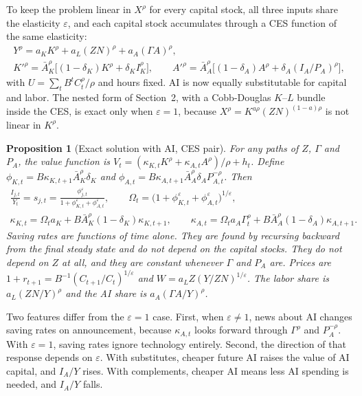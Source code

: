 \documentclass[11pt]{article}
\newtheorem{proposition}{Proposition}
\newcommand{\e}{\varepsilon}
\begin{document}
To keep the problem linear in $X^\rho$ for every capital stock, all three inputs share
the elasticity $\e$, and each capital stock accumulates through a CES function of the
same elasticity:
\begin{gather}
Y^\rho=a_KK^\rho+a_L(ZN)^\rho+a_A(\Gamma A)^\rho,\nonumber\\
K'^\rho=\bar A_K^\rho\big[(1-\delta_K)K^\rho+\delta_KI_K^\rho\big],\qquad
A'^\rho=\bar A_A^\rho\big[(1-\delta_A)A^\rho+\delta_A(I_A/P_A)^\rho\big],
\label{eq:cesAI}
\end{gather}
with $U=\sum_tB^tC_t^\rho/\rho$ and hours fixed. AI is now equally substitutable for capital
and labor. The nested form of Section~2, with a Cobb-Douglas $K$--$L$ bundle inside the CES,
is exact only when $\e=1$, because $X^\rho=K^{a\rho}(ZN)^{(1-a)\rho}$ is not linear in $K^\rho$.

\begin{proposition}[Exact solution with AI, CES pair]\label{prop:cesAI}
For any paths of $Z$, $\Gamma$ and $P_A$, the value function is
$V_t=(\kappa_{K,t}K^\rho+\kappa_{A,t}A^\rho)/\rho+h_t$. Define
$\phi_{K,t}=B\kappa_{K,t+1}\bar A_K^\rho\delta_K$ and
$\phi_{A,t}=B\kappa_{A,t+1}\bar A_A^\rho\delta_AP_{A,t}^{-\rho}$. Then
\begin{gather*}
\frac{I_{j,t}}{Y_t}=s_{j,t}=\frac{\phi_{j,t}^{\e}}{1+\phi_{K,t}^{\e}+\phi_{A,t}^{\e}},\qquad
\Omega_t=\big(1+\phi_{K,t}^{\e}+\phi_{A,t}^{\e}\big)^{1/\e},\\
\kappa_{K,t}=\Omega_ta_K+B\bar A_K^\rho(1-\delta_K)\kappa_{K,t+1},\qquad
\kappa_{A,t}=\Omega_ta_A\Gamma_t^\rho+B\bar A_A^\rho(1-\delta_A)\kappa_{A,t+1}.
\end{gather*}
Saving rates are functions of time alone. They are found by recursing backward from the
final steady state and do not depend on the capital stocks. They do not depend on $Z$
at all, and they are constant whenever $\Gamma$ and $P_A$ are. Prices are
$1+r_{t+1}=B^{-1}(C_{t+1}/C_t)^{1/\e}$ and $W=a_LZ(Y/ZN)^{1/\e}$. The labor share is
$a_L(ZN/Y)^\rho$ and the AI share is $a_A(\Gamma A/Y)^\rho$.
\end{proposition}

Two features differ from the $\e=1$ case. First, when $\e\neq1$, news about AI
changes saving rates on announcement, because $\kappa_{A,t}$ looks forward through
$\Gamma^\rho$ and $P_A^{-\rho}$. With $\e=1$, saving rates ignore technology entirely.
Second, the direction of that response depends on $\e$. With substitutes, cheaper
future AI raises the value of AI capital, and $I_A/Y$ rises. With complements, cheaper
AI means less AI spending is needed, and $I_A/Y$ falls.
\end{document}
